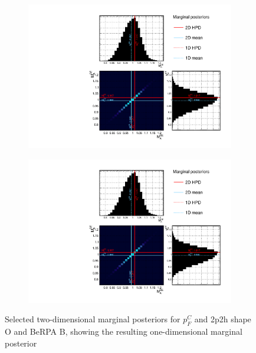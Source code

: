 \begin{figure}[h]
	\begin{subfigure}[t]{0.49\textwidth}
		\includegraphics[width=\textwidth, trim={0mm 0mm 0mm 0mm}, clip,page=15]{figures/mach3/mcmc/2017b_NewDet_3Xsec_4Det_5Flux_NewXSecTune_Asimov_merge_marg_xsec}
	\end{subfigure}
	\begin{subfigure}[t]{0.49\textwidth}
		\includegraphics[width=\textwidth, trim={0mm 0mm 0mm 0mm}, clip,page=23]{figures/mach3/mcmc/2017b_NewDet_3Xsec_4Det_5Flux_NewXSecTune_Asimov_merge_marg_xsec}
	\end{subfigure}
\caption{Selected two-dimensional marginal posteriors for $p_F^C$ and 2p2h shape O and BeRPA B, showing the resulting one-dimensional marginal posterior}
\label{fig:marginalisation_pf}
\end{figure}

